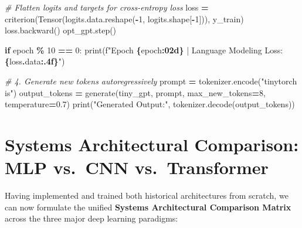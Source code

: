 \documentclass[
  letterpaper,
]{scrbook}
\newenvironment{Shaded}{\begin{snugshade}}{\end{snugshade}}
\newcommand{\BuiltInTok}[1]{#1}
\newcommand{\CommentTok}[1]{\textcolor[rgb]{0.56,0.35,0.01}{\textit{#1}}}
\newcommand{\ControlFlowTok}[1]{\textcolor[rgb]{0.13,0.29,0.53}{\textbf{#1}}}
\newcommand{\DecValTok}[1]{\textcolor[rgb]{0.00,0.00,0.81}{#1}}
\newcommand{\FloatTok}[1]{\textcolor[rgb]{0.00,0.00,0.81}{#1}}
\newcommand{\NormalTok}[1]{#1}
\newcommand{\OperatorTok}[1]{\textcolor[rgb]{0.81,0.36,0.00}{\textbf{#1}}}
\newcommand{\SpecialCharTok}[1]{\textcolor[rgb]{0.81,0.36,0.00}{\textbf{#1}}}
\newcommand{\SpecialStringTok}[1]{\textcolor[rgb]{0.31,0.60,0.02}{#1}}
\newcommand{\StringTok}[1]{\textcolor[rgb]{0.31,0.60,0.02}{#1}}
\begin{document}
\begin{Shaded}
\begin{Highlighting}[]
    \CommentTok{\# Flatten logits and targets for cross{-}entropy loss}
\NormalTok{    loss }\OperatorTok{=}\NormalTok{ criterion(Tensor(logits.data.reshape(}\OperatorTok{{-}}\DecValTok{1}\NormalTok{, logits.shape[}\OperatorTok{{-}}\DecValTok{1}\NormalTok{])), y\_train)}
\NormalTok{    loss.backward()}
\NormalTok{    opt\_gpt.step()}

    \ControlFlowTok{if}\NormalTok{ epoch }\OperatorTok{\%} \DecValTok{10} \OperatorTok{==} \DecValTok{0}\NormalTok{:}
        \BuiltInTok{print}\NormalTok{(}\SpecialStringTok{f"Epoch }\SpecialCharTok{\{}\NormalTok{epoch}\SpecialCharTok{:02d\}}\SpecialStringTok{ | Language Modeling Loss: }\SpecialCharTok{\{}\NormalTok{loss}\SpecialCharTok{.}\NormalTok{data}\SpecialCharTok{:.4f\}}\SpecialStringTok{"}\NormalTok{)}

\CommentTok{\# 4. Generate new tokens autoregressively}
\NormalTok{prompt }\OperatorTok{=}\NormalTok{ tokenizer.encode(}\StringTok{"tinytorch is"}\NormalTok{)}
\NormalTok{output\_tokens }\OperatorTok{=}\NormalTok{ generate(tiny\_gpt, prompt, max\_new\_tokens}\OperatorTok{=}\DecValTok{8}\NormalTok{, temperature}\OperatorTok{=}\FloatTok{0.7}\NormalTok{)}
\BuiltInTok{print}\NormalTok{(}\StringTok{"Generated Output:"}\NormalTok{, tokenizer.decode(output\_tokens))}
\end{Highlighting}
\end{Shaded}

\section*{Systems Architectural Comparison: MLP vs.~CNN
vs.~Transformer}\label{systems-architectural-comparison-mlp-vs.-cnn-vs.-transformer}


Having implemented and trained both historical architectures from
scratch, we can now formulate the unified \textbf{Systems Architectural
Comparison Matrix} across the three major deep learning paradigms:
\end{document}
